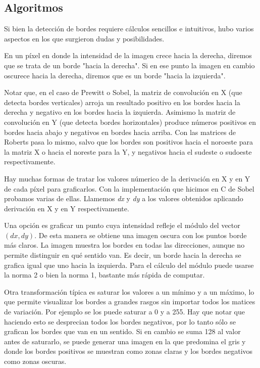 \subsection{Algoritmos}

Si bien la detección de bordes requiere cálculos sencillos e intuitivos, hubo varios aspectos en los que surgieron dudas y posibilidades.

En un píxel en donde la intensidad de la imagen crece hacia la derecha, diremos que se trata de un borde "hacia la derecha". Si en ese punto la imagen en cambio oscurece hacia la derecha, diremos que es un borde "hacia la izquierda".

Notar que, en el caso de Prewitt o Sobel, la matriz de convolución en X (que detecta bordes verticales) arroja un resultado positivo en los bordes hacia la derecha y negativo en los bordes hacia la izquierda. Asimismo la matriz de convolución en Y (que detecta bordes horizontales) produce números positivos en bordes hacia abajo y negativos en bordes hacia arriba. Con las matrices de Roberts pasa lo mismo, salvo que los bordes son positivos hacia el noroeste para la matriz X o hacia el noreste para la Y, y negativos hacia el sudeste o sudoeste respectivamente.


Hay muchas formas de tratar los valores númerico de la derivación en X y en Y de cada píxel para graficarlos. Con la implementación que hicimos en C de Sobel probamos varias de ellas. Llamemos \emph{dx} y \emph{dy} a los valores obtenidos aplicando derivación en X y en Y respectivamente.

Una opción es graficar un punto cuya intensidad refleje el módulo del vector $(dx, dy)$. De esta manera se obtiene una imagen oscura con los puntos borde más claros. La imagen muestra los bordes en todas las direcciones, aunque no permite distinguir en qué sentido van. Es decir, un borde hacia la derecha se grafica igual que uno hacia la izquierda. Para el cálculo del módulo puede usarse la norma 2 o bien la norma 1, bastante más rápida de computar.

Otra transformación típica es saturar los valores a un mínimo y a un máximo, lo que permite visualizar los bordes a grandes rasgos sin importar todos los matices de variación. Por ejemplo se los puede saturar a 0 y a 255. Hay que notar que haciendo esto se desprecian todos los bordes negativos, por lo tanto sólo se grafican los bordes que van en un sentido. Si en cambio se suma 128 al valor antes de saturarlo, se puede generar una imagen en la que predomina el gris y donde los bordes positivos se muestran como zonas claras y los bordes negativos como zonas oscuras.

